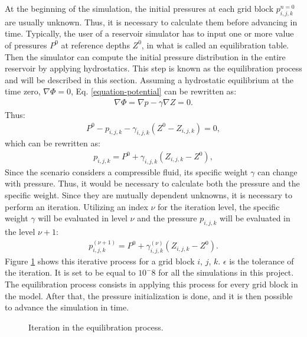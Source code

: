 At the beginning of the simulation, the initial pressures at each grid block $p_{i,j,k}^{n=0}$ are usually unknown.
%
Thus, it is necessary to calculate them before advancing in time.
%
Typically, the user of a reservoir simulator has to input one or more value of pressures $P^0$ at reference depths $Z^0$, in what is called an equilibration table.
%
Then the simulator can compute the initial pressure distribution in the entire reservoir by applying hydrostatics.
%
This step is known as the equilibration process and will be described in this section.
%
Assuming a hydrostatic equilibrium at the time zero, $\nabla \Phi = 0$, Eq. \ref{equation-potential} can be rewritten as:
%
\begin{align}
	\nabla \Phi=\nabla p - \gamma \nabla Z = 0.
\end{align}
%
Thus:
%
\begin{align}
	P^0 - p_{i,j,k} - \gamma_{i,j,k}(Z^0 - Z_{i,j,k}) = 0,
\end{align}
%
which can be rewritten as:
%
\begin{align}
	p_{i,j,k}=P^0+\gamma_{i,j,k}(Z_{i,j,k}-Z^0),
\end{align}
%
Since the scenario considers a compressible fluid, its specific weight $\gamma$ can change with pressure.
%
Thus, it would be necessary to calculate both the pressure and the specific weight.
%
Since they are mutually dependent unknowns, it is necessary to perform an iteration.
%
Utilizing an index $\nu$ for the iteration level, the specific weight $\gamma$ will be evaluated in level $\nu$ and the pressure $p_{i,j,k}$ will be evaluated in the level $\nu+1$:
%
\begin{align}
	p^{(\nu+1)}_{i,j,k}=P^0+\gamma^{(\nu)}_{i,j,k}(Z_{i,j,k}-Z^0).
\end{align}
%
Figure \ref{figure-equilibration-process-flow-chart} shows this iterative process for a grid block $i$, $j$, $k$. $\epsilon$ is the tolerance of the iteration. 
%
It is set to be equal to $10^-8$ for all the simulations in this project.
%
The equilibration process consists in applying this process for every grid block in the model.
%
After that, the pressure initialization is done, and it is then possible to advance the simulation in time.
%
%
\begin{figure}[H]
	\centering
	
	\caption{Iteration in the equilibration process.}
	\label{figure-equilibration-process-flow-chart}
\end{figure}

